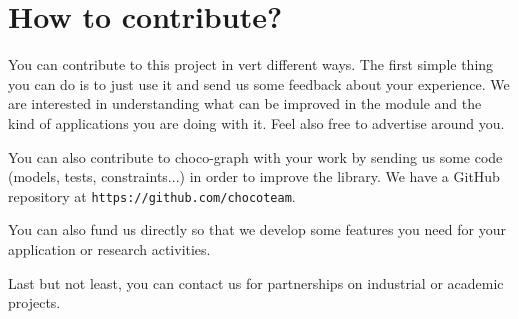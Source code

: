 \documentclass{article}
\begin{document}
\section{How to contribute?}

You can contribute to this project in vert different ways. The first simple thing you can do is to just use it and send us some feedback about your experience. 
We are interested in understanding what can be improved in the module and the kind of applications you are doing with it. 
Feel also free to advertise around you.  

You can also contribute to choco-graph with your work by sending us some code (models, tests, constraints...) in order to improve the library. 
We have a GitHub repository at \texttt{https://github.com/chocoteam}.

You can also fund us directly so that we develop some features you need for your application or research activities. 

Last but not least, you can contact us for partnerships on industrial or academic projects. 
\end{document}
